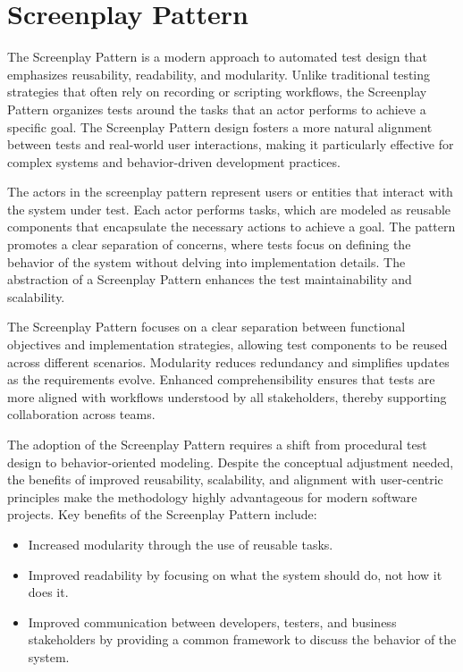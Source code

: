 \section{Screenplay Pattern}\label{sub:Screenplay_pattern}

The Screenplay Pattern is a modern approach to automated test design that emphasizes reusability, readability, and modularity. Unlike traditional testing strategies that often rely on recording or scripting workflows, the Screenplay Pattern organizes tests around the tasks that an actor performs to achieve a specific goal. The Screenplay Pattern design fosters a more natural alignment between tests and real-world user interactions, making it particularly effective for complex systems and behavior-driven development practices. 

The actors in the screenplay pattern represent users or entities that interact with the system under test. Each actor performs tasks, which are modeled as reusable components that encapsulate the necessary actions to achieve a goal. The pattern promotes a clear separation of concerns, where tests focus on defining the behavior of the system without delving into implementation details. The abstraction of a Screenplay Pattern enhances the test maintainability and scalability.

The Screenplay Pattern focuses on a clear separation between functional objectives and implementation strategies, allowing test components to be reused across different scenarios. Modularity reduces redundancy and simplifies updates as the requirements evolve. Enhanced comprehensibility ensures that tests are more aligned with workflows understood by all stakeholders, thereby supporting collaboration across teams.  

The adoption of the Screenplay Pattern requires a shift from procedural test design to behavior-oriented modeling. Despite the conceptual adjustment needed, the benefits of improved reusability, scalability, and alignment with user-centric principles make the methodology highly advantageous for modern software projects.
Key benefits of the Screenplay Pattern include:
\begin{itemize}
    \item Increased modularity through the use of reusable tasks.
    \item Improved readability by focusing on what the system should do, not how it does it.
    \item Improved communication between developers, testers, and business stakeholders by providing a common framework to discuss the behavior of the system.
\end{itemize}

